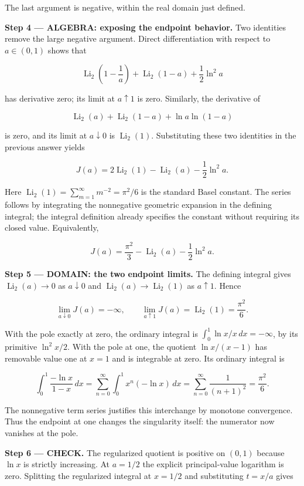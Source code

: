 \documentclass[11pt,oneside,openany]{book}
\begin{document}
The last argument is negative, within the real domain just defined.

\begingroup\color{AlgebraBlue}
\textbf{Step 4 --- ALGEBRA: exposing the endpoint behavior.} Two identities remove the large negative argument. Direct differentiation with respect to \(a\in(0,1)\) shows that

\[
\operatorname{Li}_2\left(1-\frac1a\right)
+\operatorname{Li}_2(1-a)+\frac12\ln^2a
\]

has derivative zero; its limit at \(a\uparrow1\) is zero. Similarly, the derivative of

\[
\operatorname{Li}_2(a)+\operatorname{Li}_2(1-a)
+\ln a\ln(1-a)
\]

is zero, and its limit at \(a\downarrow0\) is \(\operatorname{Li}_2(1)\). Substituting these two identities in the previous answer yields

\[
J(a)=2\operatorname{Li}_2(1)-\operatorname{Li}_2(a)-\frac12\ln^2a.
\]

Here \(\operatorname{Li}_2(1)=\sum_{m=1}^\infty m^{-2}=\pi^2/6\) is the standard Basel constant. The series follows by integrating the nonnegative geometric expansion in the defining integral; the integral definition already specifies the constant without requiring its closed value. Equivalently,

\[
J(a)=\frac{\pi^2}{3}-\operatorname{Li}_2(a)-\frac12\ln^2a.
\]

\endgroup
\begin{DomainStep}
\textbf{Step 5 --- DOMAIN: the two endpoint limits.} The defining integral gives \(\operatorname{Li}_2(a)\to0\) as \(a\downarrow0\) and \(\operatorname{Li}_2(a)\to\operatorname{Li}_2(1)\) as \(a\uparrow1\). Hence

\[
\lim_{a\downarrow0}J(a)=-\infty,\qquad
\lim_{a\uparrow1}J(a)=\operatorname{Li}_2(1)=\frac{\pi^2}{6}.
\]

With the pole exactly at zero, the ordinary integral is \(\int_0^1\ln x/x\,dx=-\infty\), by its primitive \(\ln^2x/2\). With the pole at one, the quotient \(\ln x/(x-1)\) has removable value one at \(x=1\) and is integrable at zero. Its ordinary integral is

\[
\int_0^1\frac{-\ln x}{1-x}\,dx
=\sum_{n=0}^\infty\int_0^1x^n(-\ln x)\,dx
=\sum_{n=0}^\infty\frac1{(n+1)^2}
=\frac{\pi^2}{6}.
\]

The nonnegative term series justifies this interchange by monotone convergence. Thus the endpoint at one changes the singularity itself: the numerator now vanishes at the pole.

\end{DomainStep}
\textbf{Step 6 --- CHECK.} The regularized quotient is positive on \((0,1)\) because \(\ln x\) is strictly increasing. At \(a=1/2\) the explicit principal-value logarithm is zero. Splitting the regularized integral at \(x=1/2\) and substituting \(t=x/a\) gives
\end{document}
